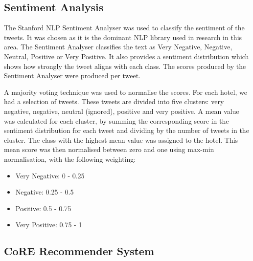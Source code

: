 \subsection{Sentiment Analysis}

The Stanford NLP Sentiment Analyser \cite{stanfordSentiment2013} was used to classify the sentiment of the tweets. It was chosen as it is the dominant NLP library used in research in this area. The Sentiment Analyser classifies the text as Very Negative, Negative, Neutral, Positive or Very Positive. It also provides a sentiment distribution which shows how strongly the tweet aligns with each class. The scores produced by the Sentiment Analyser were produced per tweet.

A majority voting technique was used to normalise the scores. For each hotel, we had a selection of tweets. These tweets are divided into five clusters: very negative, negative, neutral (ignored), positive and very positive. A mean value was calculated for each cluster, by summing the corresponding score in the sentiment distribution for each tweet and dividing by the number of tweets in the cluster. The class with the highest mean value was assigned to the hotel. This mean score was then normalised between zero and one using max-min normalisation, with the following weighting: 
\begin{itemize}
    \item Very Negative: 0 - 0.25
    \item Negative: 0.25 - 0.5
    \item Positive: 0.5 - 0.75
    \item Very Positive: 0.75 - 1
\end{itemize}



\subsection{CoRE Recommender System}

